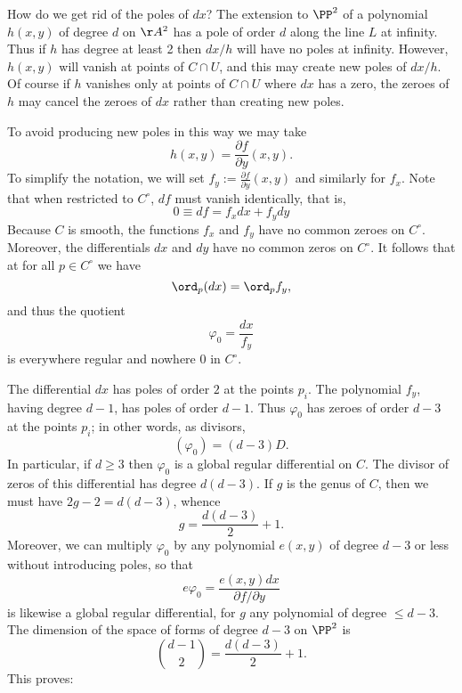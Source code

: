 How do we get rid of the poles of $dx$? The extension to $\PP^2$ of a polynomial $h(x,y)$ of degree $d$ on
$\AA^2$ has a pole of order $d$ along the line $L$ at infinity. Thus if $h$ has degree at least 2 then $dx/h$ will have no poles at infinity. However, $h(x,y)$ will vanish at points of $C \cap U$, and this may create new poles of $dx/h$. Of course if $h$ vanishes only at  points of $C \cap U$ where $dx$ has a zero, the zeroes of $h$ may cancel the zeroes of $dx$ rather than creating new poles.
 
 To avoid producing new poles in this way we may take
 $$
 h(x,y) = \frac{\partial f}{\partial y}(x,y).
 $$
To simplify the notation, we will set  $f_{y}:= \frac{\partial f}{\partial y}(x,y)$ and similarly for
$f_{x}$. Note that  when restricted to $C^\circ$, $df$ must vanish identically, that is,
 $$
 0 \equiv df = f_{x}dx + f_{y}dy 
 $$
Because $C$ is smooth, the functions $f_{x}$ and $f_{y}$ have no common zeroes on $C^\circ$. Moreover, the differentials $dx$ and $dy$ have no common zeros on $C^\circ$. It follows that at for all $p \in C^\circ$ we  have
$$
\ord_p(dx) = \ord_pf_{y}, 
$$ 
and thus the quotient 
$$
\varphi_0 = \frac{dx}{f_{y}}
$$
is everywhere regular and nowhere 0 in $C^\circ$.

The differential $dx$ has poles of order $2$ at the points $p_i$. The polynomial $f_{y}$, having degree $d-1$, has poles of order $d-1$. Thus $\varphi_0$ has zeroes of order $d-3$ at the points $p_i$; in other words, as divisors,
$$
(\varphi_0) = (d-3)D.
$$
In particular, if $d \geq 3$ then $\varphi_0$ is a global regular differential on $C$. The divisor of
zeros of this differential has degree $d(d-3)$. If $g$ is the genus of $C$, then we must
have $2g-2 = d(d-3)$, whence 
$$
g = \frac{d(d-3)}{2} + 1.
$$
Moreover, we can  multiply $\varphi_0$ by any polynomial $e(x,y)$ 
  of degree $d-3$ or less without introducing poles, so that 
$$
e\varphi_0 = \frac{e(x,y)dx}{\partial f/\partial y}
$$ 
is likewise a global regular differential, for $g$  any polynomial of degree $\leq d-3$. The dimension 
of the space of forms of degree $d-3$ on $\PP^{2}$ is 
$$
\binom{d-1}{2} =  \frac{d(d-3)}{2} + 1.
$$
This proves:

